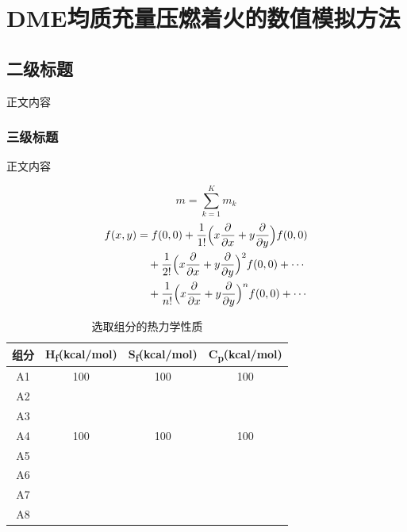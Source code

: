\chapter{DME均质充量压燃着火的数值模拟方法}

\section{二级标题}

正文内容

\subsection{三级标题}

正文内容

\begin{equation}
  m = \sum_{k=1}^{K} m_k
  \label{eq:sum}
\end{equation}
\begin{equation}
  \begin{aligned}
    f(x,y) &= f(0,0)+\frac{1}{1!}\Bigl(x\frac{\partial}{\partial x}+y\frac{\partial}{\partial y}\Bigr)f(0,0)\\
           &\quad +\frac{1}{2!}\Bigl(x\frac{\partial}{\partial x}+y\frac{\partial}{\partial y}\Bigr)^{2}f(0,0)+\cdots\\
           &\quad +\frac{1}{n!}\Bigl(x\frac{\partial}{\partial x}+y\frac{\partial}{\partial y}\Bigr)^{n}f(0,0)+\cdots
  \end{aligned}
  \label{eq:taylor}
\end{equation}

\begin{table}[htbp]
  \centering
  \caption{选取组分的热力学性质}\label{tab:thermo}
  \begin{tabular}{cccc}
    \toprule
    组分 & H\textsubscript{f}(kcal/mol) & S\textsubscript{f}(kcal/mol) & C\textsubscript{p}(kcal/mol) \\
    \midrule
    A1 & 100 & 100 & 100 \\
    A2 &     &     &     \\
    A3 &     &     &     \\
    A4 & 100 & 100 & 100 \\
    A5 &     &     &     \\
    A6 &     &     &     \\
    A7 &     &     &     \\
    A8 &     &     &     \\
    \bottomrule
  \end{tabular}
\end{table}

